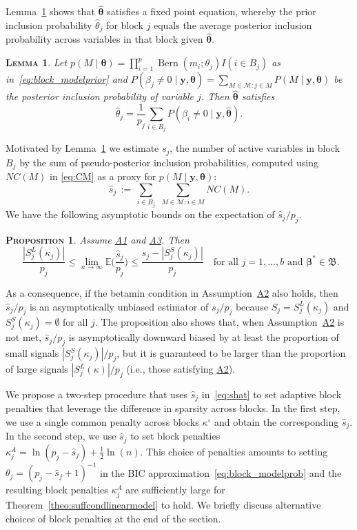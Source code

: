 \documentclass[
  12pt]{article}
\newcommand{\E}{\mathbb{E}}
\newcommand{\M}{\mathcal{M}}
\newcommand{\by}{\mathbf{y}}
\newcommand{\bbeta}{\boldsymbol{\beta}}
\newcommand{\btheta}{\boldsymbol{\theta}}
\newtheorem{prop}[thm]{\textsc{Proposition}}
\newtheorem{lem}[thm]{\textsc{Lemma}}
\begin{document}
Lemma~\ref{lem:empiricalbayesinterpret} shows that $\hat{\btheta}$ satisfies a fixed point equation, whereby the prior inclusion probability $\hat{\theta}_j$ for block $j$ equals the average posterior inclusion probability across variables in that block given $\hat{\btheta}$.
\begin{lem}\label{lem:empiricalbayesinterpret} 
Let $p(M \mid \btheta)= \prod_{i=1}^p \operatorname{Bern}\left(m_i ; \theta_j\right) I(i \in B_j)$ as in~\eqref{eq:block_modelprior} and $P(\beta_j \neq 0 \mid \by, \btheta)= \sum_{M\in\M: j\in M} P(M \mid \by,\btheta)$ be the posterior inclusion probability of variable $j$. Then $\hat{\btheta}$ satisfies 
\[\hat{\theta}_j= \frac{1}{p_j}\sum_{i\in B_j} P(\beta_i \neq 0 \mid \by, \hat{\btheta}).
\]
\end{lem}

Motivated by Lemma~\ref{lem:empiricalbayesinterpret} we estimate $s_j$, the number of active variables in block $B_j$ by the sum of pseudo-posterior inclusion probabilities,
computed using $NC(M)$ in \eqref{eq:CM} as a proxy for $p(M\mid \by,\btheta)$:
\begin{equation}\label{eq:shat}
    \hat{s}_j \,:=\, \sum_{i\in B_j}\,\,\sum_{M\in \M : i \in M}NC(M).
\end{equation}
We have the following asymptotic bounds on the expectation of $\hat{s}_j/p_j$. 
\begin{prop}
    \label{prop:shatconsistence}
Assume \hyperlink{lab:A1}{A1} and \hyperlink{lab:A3}{A3}. Then
\[ \,\, \frac{|S_j^{L}(\kappa_j)|}{p_j}\leq \lim_{n\to\infty}\E\bigg(\frac{\hat{s}_j}{p_j}\bigg)\leq \frac{s_j-|S_j^{S}(\kappa_j)|}{p_j}\quad\text{for all }j=1,\ldots,b \text{ and }\bbeta^*\in\mathfrak{B}.\]

\end{prop}
As a consequence, if the betamin condition in Assumption~\hyperlink{lab:A2}{A2} also holds, then $\hat{s}_j/p_j$ is an asymptotically unbiased
estimator of $s_j/p_j$ because $S_j=S_j^{L}(\kappa_j)$ and $S_j^{S}(\kappa_j)=\emptyset$ for all $j$. 
The proposition also shows that, when Assumption~\hyperlink{lab:A2}{A2} is not met, $\hat{s}_j/p_j$ is asymptotically downward biased by at least the proportion of small signals $|S_j^{S}(\kappa_j)|/p_j$, but it is guaranteed to be larger than the proportion of large signals $|S_j^L(\kappa)|/p_j$ (i.e., those satisfying \hyperlink{lab:A2}{A2}).

We propose a two-step procedure that uses $\hat{s}_j$ in~\eqref{eq:shat} to set adaptive block penalties that leverage the difference in sparsity across blocks. 
In the first step,  we use a single common penalty across blocks $\kappa^{\circ}$ and obtain the corresponding $\hat{s}_j$.
In the second step, we use $\hat{s}_j$ to set block penalties $\kappa_j^{A}= \ln(p_j-\hat{s}_j)+ \tfrac{1}{2}\ln(n)$.
This choice of penalties amounts to setting $\theta_j= (p_j-\hat{s}_j+1)^{-1}$ in the BIC approximation~\eqref{eq:block_modelprob} and the resulting block penalties $\kappa_j^{A}$ 
are sufficiently large for Theorem~\ref{theo:suffcondlinearmodel} to hold. \color{green} We briefly discuss alternative choices of block penalties at the end of the section.\color{black}
\end{document}
